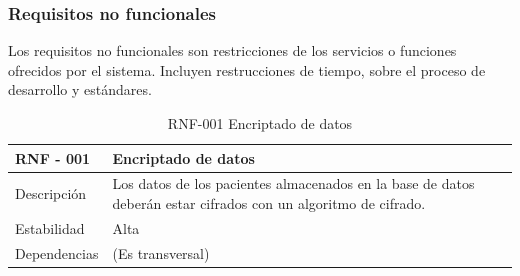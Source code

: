 \subsubsection{Requisitos no funcionales}


Los requisitos no funcionales son restricciones de los servicios o funciones ofrecidos por el sistema. Incluyen restrucciones de tiempo, sobre el proceso de desarrollo y estándares\cite{sommerville}.

\begin{table}[htpb]
\centering
\begin{tabularx}{\textwidth}{|l|X|}
\hline
RNF - 001                               & Encriptado de datos                                                                                            \\ \hline
Descripción                             & Los datos de los pacientes almacenados en la base de datos deberán estar cifrados con un algoritmo de cifrado. \\ \hline
Estabilidad                             & Alta                                                                                                           \\ \hline
Dependencias & (Es transversal)                                                                                               \\ \hline
\end{tabularx}
\caption{RNF-001 Encriptado de datos}                                                                                                                                                                                                                                                                      
\end{table}

\clearpage

